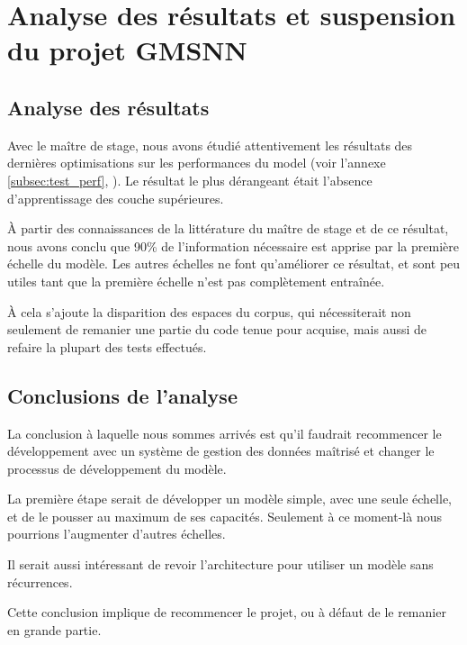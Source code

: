 \section{Analyse des résultats et suspension du projet GMSNN}\label{white_flag}



\subsection{Analyse des résultats}
Avec le maître de stage, nous avons étudié attentivement les résultats des dernières optimisations sur les performances du \gls{model} (voir l'annexe \ref{subsec:test_perf}, ). 
Le résultat le plus dérangeant était l'absence d'apprentissage des couche supérieures.

À partir des connaissances de la littérature du maître de stage et de ce résultat, nous avons conclu que 90\% de l'information nécessaire est apprise par la première échelle du modèle. Les autres échelles ne font qu'améliorer ce résultat, et sont peu utiles tant que la première échelle n'est pas complètement entraînée.

À cela s'ajoute la disparition des espaces du corpus, qui nécessiterait non seulement de remanier une partie du code tenue pour acquise, mais aussi de refaire la plupart des tests effectués.

\subsection{Conclusions de l'analyse}
La conclusion à laquelle nous sommes arrivés est qu'il faudrait recommencer le développement avec un système de gestion des données maîtrisé et changer le processus de développement du modèle.

La première étape serait de développer un modèle simple, avec une seule échelle, et de le pousser au maximum de ses capacités. Seulement à ce moment-là nous pourrions l'augmenter d'autres échelles.

Il serait aussi intéressant de revoir l'architecture pour utiliser un modèle sans récurrences.

Cette conclusion implique de recommencer le projet, ou à défaut de le remanier en grande partie.

